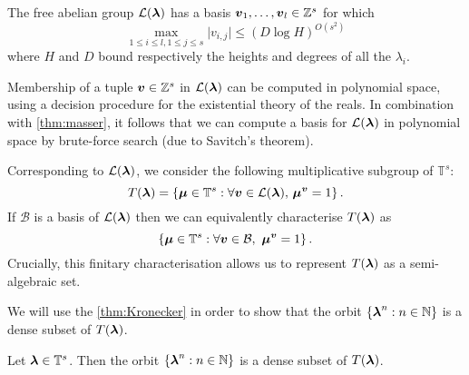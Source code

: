 \begin{theorem}[Masser]
\label{thm:masser}
The free abelian group ${\cal{L}}(\boldsymbol{\lambda})$ has a basis $\boldsymbol{v}_1, \ldots, \boldsymbol{v}_{l} \in \mathbb{Z}^{s}$ for which
\[ \max\limits_{1\leq i\leq l,1\leq j\leq s} \lvert v_{i,j} \rvert \leq (D\log H)^{O(s^2)} \]
where $H$ and $D$ bound respectively the heights and degrees of all the $\lambda_{i}$.
\end{theorem}
Membership of a tuple $\boldsymbol{v}\in \mathbb{Z}^{s}$ in ${\cal{L}}(\boldsymbol{\lambda})$ can be computed in polynomial space, using a decision procedure for the existential theory of the reals. In combination with \cref{thm:masser}, it follows that we can compute a basis for ${\cal{L}}(\boldsymbol{\lambda})$ in polynomial space by brute-force search (due to Savitch's theorem).

Corresponding to ${\cal{L}}(\boldsymbol{\lambda})$, we consider the following
multiplicative subgroup of $\mathbb{T}^{s}$:
\begin{equation*}
T(\boldsymbol{\lambda})=\lbrace \boldsymbol{\mu} \in \mathbb{T}^{s} : \forall \boldsymbol{v} \in {\cal{L}}(\boldsymbol{\lambda}), \, \boldsymbol{\mu}^{\boldsymbol{v}} = 1 \rbrace \, .
\end{equation*}
If $\mathcal{B}$ is a basis of ${\cal{L}}(\boldsymbol{\lambda})$ then we can
equivalently characterise $T(\boldsymbol{\lambda})$ as
\begin{equation*}
\lbrace \boldsymbol{\mu} \in \mathbb{T}^{s}: \forall \boldsymbol{v} \in \mathcal{B}, \, \, \boldsymbol{\mu}^{\boldsymbol{v}} = 1 \rbrace \, .
\end{equation*}
Crucially, this finitary characterisation allows us to represent $T(\boldsymbol\lambda)$ as a semi-algebraic set.

We will use the \cref{thm:Kronecker} in order to show that the orbit $\lbrace
\boldsymbol\lambda^n : n\in\mathbb{N} \rbrace$ is a dense subset of
$T(\boldsymbol{\lambda})$.

\begin{theorem}
\label{dense}
Let $\boldsymbol{\lambda}\in\mathbb{T}^s$. Then the orbit $\lbrace \boldsymbol\lambda^n : n\in\mathbb{N} \rbrace$ is a dense subset of $T(\boldsymbol{\lambda})$.
\end{theorem}

